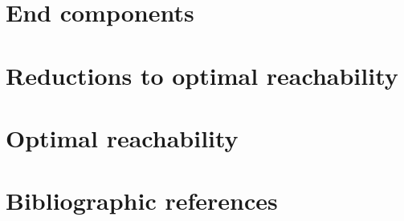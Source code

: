 \section{End components}
\label{5-sec:end_components}


\section{Reductions to optimal reachability}
\label{5-sec:reductions}


\section{Optimal reachability}
\label{5-sec:optimal_reachability}


\section*{Bibliographic references}
\label{5-sec:references}

